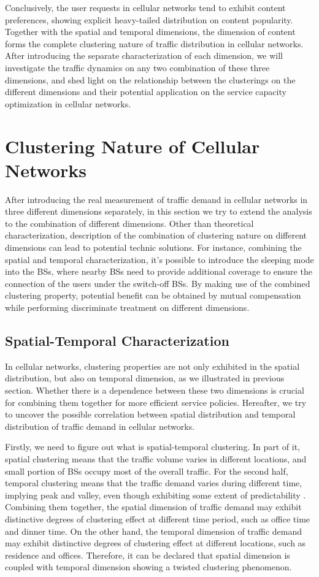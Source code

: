 Conclusively, the user requests in cellular networks tend to exhibit content preferences, showing explicit heavy-tailed distribution on content popularity. Together with the spatial and temporal dimensions, the dimension of content forms the complete clustering nature of traffic distribution in cellular networks. After introducing the separate characterization of each dimension, we will investigate the traffic dynamics on any two combination of these three dimensions, and shed light on the relationship between the clusterings on the different dimensions and their potential application on the service capacity optimization in cellular networks.

\section{Clustering Nature of Cellular Networks}
After introducing the real measurement of traffic demand in cellular networks in three different dimensions separately, in this section we try to extend the analysis to the combination of different dimensions. Other than theoretical characterization, description of the combination of clustering nature on different dimensions can lead to potential technic solutions. For instance, combining the spatial and temporal characterization, it's possible to introduce the sleeping mode into the BSs, where nearby BSs need to provide additional coverage to ensure the connection of the users under the switch-off BSs. By making use of the combined clustering property, potential benefit can be obtained by mutual compensation while performing discriminate treatment on different dimensions.
\subsection{Spatial-Temporal Characterization}
In cellular networks, clustering properties are not only exhibited in the spatial distribution, but also on temporal dimension, as we illustrated in previous section. Whether there is a dependence between these two dimensions is crucial for combining them together for more efficient service policies. Hereafter, we try to uncover the possible correlation between spatial distribution and temporal distribution of traffic demand in cellular networks.

Firstly, we need to figure out what is spatial-temporal clustering. In part of it, spatial clustering means that the traffic volume varies in different locations, and small portion of BSs occupy most of the overall traffic. For the second half, temporal clustering means that the traffic demand varies during different time, implying peak and valley, even though exhibiting some extent of predictability \cite{zhou2012predictability}. Combining them together, the spatial dimension of traffic demand may exhibit distinctive degrees of clustering effect at different time period, such as office time and dinner time. On the other hand, the temporal dimension of traffic demand may exhibit distinctive degrees of clustering effect at different locations, such as residence and offices. Therefore, it can be declared that spatial dimension is coupled with temporal dimension showing a twisted clustering phenomenon.

